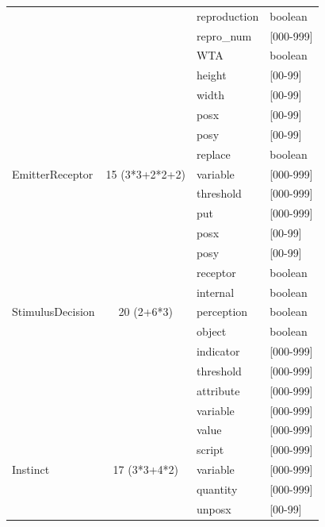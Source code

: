 \documentclass[11pt,twoside,a4paper]{article}
\begin{document}
\begin{table}[h]
\begin{center}
\begin{scriptsize}
\begin{tabular}{|p{}|c|p{}|p{}|}
								&				&	reproduction& boolean \\
	\cline{3-4} %
								&				&	repro\_num	& [000-999] \\
	\cline{3-4} %
								&				&	WTA			& boolean \\
	\cline{3-4} %
								&				&	height		& [00-99] \\
	\cline{3-4} %
								&				&	width		& [00-99] \\
	\cline{3-4} %
								&				&	posx		& [00-99] \\
	\cline{3-4} %
								&				&	posy		& [00-99] \\
	\cline{3-4} %
								&				&	replace		& boolean \\
	\hline \hline
	EmitterReceptor				& 15 (3*3+2*2+2)&	variable	& [000-999] \\
	\cline{3-4} %
								&				&	threshold	& [000-999] \\
	\cline{3-4} %
								&				&	put			& [000-999] \\
	\cline{3-4} %
								&				&	posx		& [00-99] \\
	\cline{3-4} %
								&				&	posy		& [00-99] \\
	\cline{3-4} %
								&				&	receptor	& boolean \\
	\cline{3-4} %
								&				&	internal	& boolean	\\
	\hline \hline
	StimulusDecision			&	20 (2+6*3)	&	perception	& boolean \\
	\cline{3-4} %
								&				&	object		& boolean \\
	\cline{3-4} %
								&				&	indicator	& [000-999] \\
	\cline{3-4} %
								&				&	threshold	& [000-999] \\
	\cline{3-4} %
								&				&	attribute	& [000-999] \\
	\cline{3-4} %
								&				&	variable	& [000-999] \\
	\cline{3-4} %
								&				&	value		& [000-999] \\
	\cline{3-4} %
								&				&	script		& [000-999] \\
	\hline \hline
	Instinct					&	17 (3*3+4*2)&	variable	& [000-999] \\
	\cline{3-4} %
								&				&	quantity	& [000-999] \\
	\cline{3-4} %
								&				&	unposx		& [00-99] \\
	\cline{3-4} %

\end{tabular}
\end{scriptsize}
\end{center}
\end{table}
\end{document}
